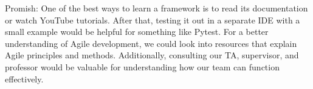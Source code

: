 \documentclass[12pt, titlepage]{article}
\begin{document}
\begin{enumerate}
  \hspace{2em} Promish: One of the best ways to learn a framework is to read its 
  documentation or watch YouTube tutorials. After that, testing it out in a separate IDE 
  with a small example would be helpful for something like Pytest. For a better 
  understanding of Agile development, we could look into resources that explain Agile 
  principles and methods. Additionally, consulting our TA, supervisor, and professor 
  would be valuable for understanding how our team can function effectively.\\\\

\end{enumerate}
\end{document}
